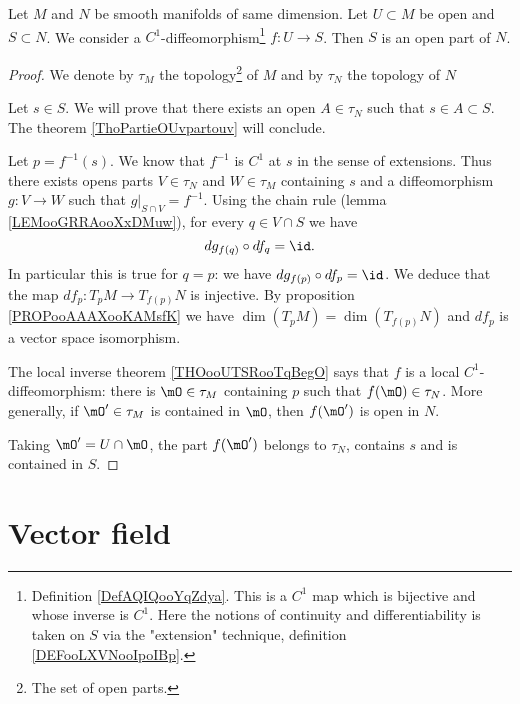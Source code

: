 \begin{theorem}	\label{THOooGUELooSBQhRu}
	Let \( M\) and \( N\) be smooth manifolds of same dimension. Let \( U\subset M\) be open and \( S\subset N\). We consider a \( C^1\)-diffeomorphism\footnote{Definition \ref{DefAQIQooYqZdya}. This is a \( C^1\) map which is bijective and whose inverse is \( C^1\). Here the notions of continuity and differentiability is taken on \( S\) via the "extension" technique, definition \ref{DEFooLXVNooIpoIBp}.} \(f \colon U\to S  \). Then \( S\) is an open part of \( N\).
\end{theorem}

\begin{proof}
	We denote by \( \tau_M\) the topology\footnote{The set of open parts.} of \( M\) and by \( \tau_N\) the topology of $N$

	Let \( s\in S\). We will prove that there exists an open \( A\in \tau_N\) such that \( s\in A\subset S\). The theorem \ref{ThoPartieOUvpartouv} will conclude.

	Let \( p=f^{-1}(s)\). We know that \( f^{-1}\) is \( C^1\) at \( s\) in the sense of extensions. Thus there exists opens parts \( V\in\tau_N\) and \( W\in\tau_M\) containing \( s\) and a diffeomorphism \(g \colon V\to W  \) such that \( g|_{S\cap V}=f^{-1}\). Using the chain rule (lemma \ref{LEMooGRRAooXxDMuw}), for every \( q\in V\cap S\) we have
	\begin{equation}
		dg_{f(q)}\circ df_q=\id.
	\end{equation}
	In particular this is true for \( q=p\): we have \( dg_{f(p)}\circ df_p=\id\). We deduce that the map \(df_p \colon T_pM\to T_{f(p)}N  \) is injective. By proposition \ref{PROPooAAAXooKAMsfK} we have \( \dim(T_pM)=\dim(T_{f(p)}N)\) and \( df_p\) is a vector space isomorphism.

	The local inverse theorem \ref{THOooUTSRooTqBegO} says that \( f\) is a local \( C^1\)-diffeomorphism: there is \( \mO\in\tau_M\) containing \( p\) such that \( f(\mO)\in\tau_N\). More generally, if \( \mO'\in \tau_M\) is contained in \( \mO\), then \( f(\mO')\) is open in \( N\).

	Taking \( \mO'=U\cap\mO\), the part \( f(\mO')\) belongs to \( \tau_N\), contains \( s\) and is contained in \( S\).
\end{proof}

\section{Vector field}

